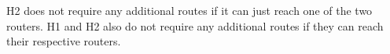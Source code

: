 H2 does not require any additional routes if it can just reach one of the two routers. H1 and H2 also do not require any additional routes if they can reach their respective routers.